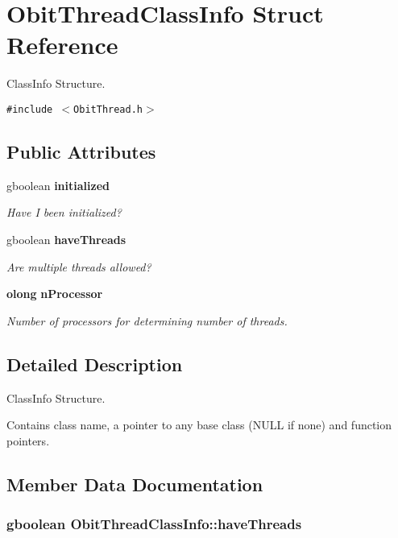 \section{Obit\-Thread\-Class\-Info Struct Reference}
\label{structObitThreadClassInfo}
Class\-Info Structure.  


{\tt \#include $<$Obit\-Thread.h$>$}

\subsection*{Public Attributes}
\begin{CompactItemize}
\item 
gboolean {\bf initialized}
\begin{CompactList}\small\item\em Have I been initialized? \item\end{CompactList}\item 
gboolean {\bf have\-Threads}
\begin{CompactList}\small\item\em Are multiple threads allowed? \item\end{CompactList}\item 
{\bf olong} {\bf n\-Processor}
\begin{CompactList}\small\item\em Number of processors for determining number of threads. \item\end{CompactList}\end{CompactItemize}


\subsection{Detailed Description}
Class\-Info Structure. 

Contains class name, a pointer to any base class (NULL if none) and function pointers. 



\subsection{Member Data Documentation}
\subsubsection{\setlength{\rightskip}{0pt plus 5cm}gboolean {\bf Obit\-Thread\-Class\-Info::have\-Threads}}\label{structObitThreadClassInfo_o1}


